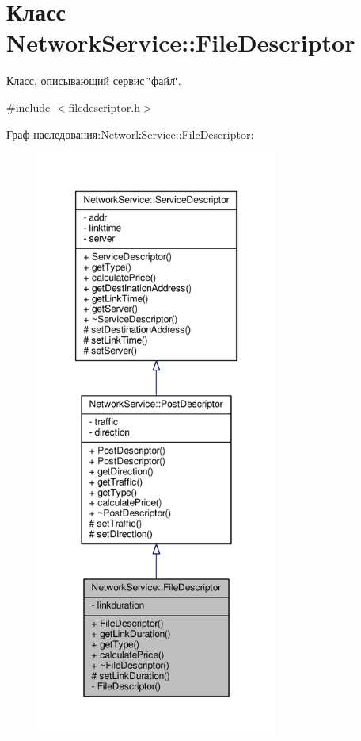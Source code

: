 \hypertarget{class_network_service_1_1_file_descriptor}{}\section{Класс Network\+Service\+:\+:File\+Descriptor}
\label{class_network_service_1_1_file_descriptor}


Класс, описывающий сервис \char`\"{}файл\char`\"{}.  




{\ttfamily \#include $<$filedescriptor.\+h$>$}



Граф наследования\+:Network\+Service\+:\+:File\+Descriptor\+:\nopagebreak
\begin{figure}[H]
\begin{center}
\leavevmode
\includegraphics[height=550pt]{class_network_service_1_1_file_descriptor__inherit__graph}
\end{center}
\end{figure}


